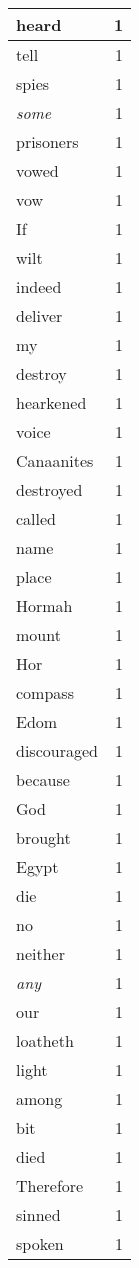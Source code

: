 \begin{center}
\begin{longtable}{l|r}
heard & 1 \\ \hline
tell & 1 \\ \hline
spies & 1 \\ \hline
\emph{some} & 1 \\ \hline
prisoners & 1 \\ \hline
vowed & 1 \\ \hline
vow & 1 \\ \hline
If & 1 \\ \hline
wilt & 1 \\ \hline
indeed & 1 \\ \hline
deliver & 1 \\ \hline
my & 1 \\ \hline
destroy & 1 \\ \hline
hearkened & 1 \\ \hline
voice & 1 \\ \hline
Canaanites & 1 \\ \hline
destroyed & 1 \\ \hline
called & 1 \\ \hline
name & 1 \\ \hline
place & 1 \\ \hline
Hormah & 1 \\ \hline
mount & 1 \\ \hline
Hor & 1 \\ \hline
compass & 1 \\ \hline
Edom & 1 \\ \hline
discouraged & 1 \\ \hline
because & 1 \\ \hline
God & 1 \\ \hline
brought & 1 \\ \hline
Egypt & 1 \\ \hline
die & 1 \\ \hline
no & 1 \\ \hline
neither & 1 \\ \hline
\emph{any} & 1 \\ \hline
our & 1 \\ \hline
loatheth & 1 \\ \hline
light & 1 \\ \hline
among & 1 \\ \hline
bit & 1 \\ \hline
died & 1 \\ \hline
Therefore & 1 \\ \hline
sinned & 1 \\ \hline
spoken & 1 \\ \hline

\end{longtable}
\end{center}
